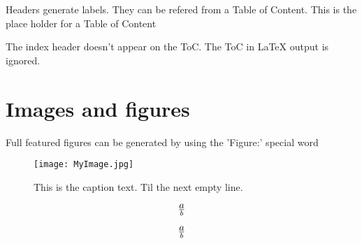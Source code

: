 Headers generate labels.
They can be refered from a Table of Content.
This is the place holder for a Table of Content


The index header doesn't appear on the ToC.
The ToC in LaTeX output is ignored.

\section{Images and figures}
\label{OtherLabel}

Full featured figures can be generated by using the 'Figure:' special word
\begin{figure*}[htbp]
\begin{center}\texttt{[image: MyImage.jpg]}\end{center}
\caption{%
This is the caption text.
Til the next empty line.
}
\label{MyLabel}
\end{figure*}


\[
a\over{b}
\]

\begin{equation}
a\over{b}
\end{equation}






